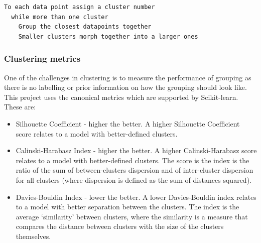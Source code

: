 \begin{lstlisting}[caption={Agglomerative hierarchical clustering pseudocode, style=\small}, label={code:agg_clustering}]
  To each data point assign a cluster number
  while more than one cluster
    Group the closest datapoints together 
    Smaller clusters morph together into a larger ones
\end{lstlisting} 

\subsubsection*{Clustering metrics}

One of the challenges in clustering is to measure the performance of grouping as there is no labelling or prior information on how the grouping should look like. This project uses the canonical metrics which are supported by Scikit-learn\cite{Pedregosa2011-ts,Scikit-learn_undated-ax}. These are:
\begin{itemize}
  \item Silhouette Coefficient - higher the better. A higher Silhouette Coefficient score relates to a model with better-defined clusters. 
  \item Calinski-Harabasz Index - higher the better. A higher Calinski-Harabasz score relates to a model with better-defined clusters.  The score is the index is the ratio of the sum of between-clusters dispersion and of inter-cluster dispersion for all clusters (where dispersion is defined as the sum of distances squared).
  \item Davies-Bouldin Index - lower the better. A lower Davies-Bouldin index relates to a model with better separation between the clusters. The index is the average ‘similarity’ between clusters, where the similarity is a measure that compares the distance between clusters with the size of the clusters themselves.
\end{itemize}


